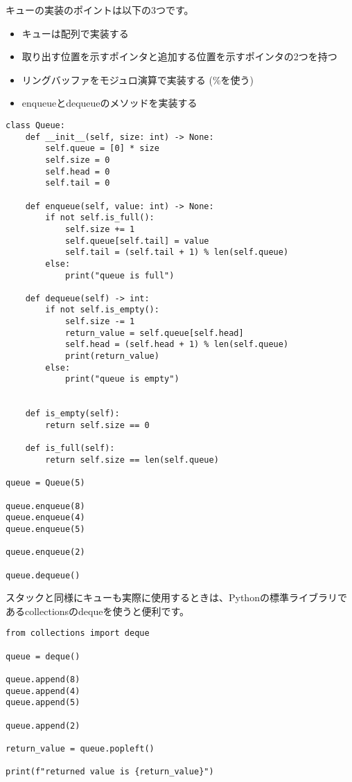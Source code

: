 \documentclass{jlreq}
\begin{document}
キューの実装のポイントは以下の3つです。
\begin{itemize}
	\item キューは配列で実装する
	\item 取り出す位置を示すポインタと追加する位置を示すポインタの2つを持つ
	\item リングバッファをモジュロ演算で実装する (\%を使う)
	\item enqueueとdequeueのメソッドを実装する
\end{itemize}

\begin{lstlisting}[caption=キューの実装, frame=TRBL, label={queue}]
	class Queue:
    def __init__(self, size: int) -> None:
        self.queue = [0] * size
        self.size = 0
        self.head = 0
        self.tail = 0
        
    def enqueue(self, value: int) -> None:
        if not self.is_full():
            self.size += 1
            self.queue[self.tail] = value
            self.tail = (self.tail + 1) % len(self.queue)
        else:
            print("queue is full")
    
    def dequeue(self) -> int:
        if not self.is_empty():
            self.size -= 1
            return_value = self.queue[self.head]
            self.head = (self.head + 1) % len(self.queue)
            print(return_value)
        else:
            print("queue is empty")
        
    
    def is_empty(self):
        return self.size == 0

    def is_full(self):
        return self.size == len(self.queue)

queue = Queue(5)

queue.enqueue(8)
queue.enqueue(4)
queue.enqueue(5)

queue.enqueue(2)

queue.dequeue()

\end{lstlisting}

\begin{tcolorbox}[enhanced, title=Column2 collections.deque, breakable, colback=white, drop fuzzy shadow, attach boxed title to top center={yshift*=0.1cm}]
	スタックと同様にキューも実際に使用するときは、Pythonの標準ライブラリであるcollectionsのdequeを使うと便利です。
	
	\begin{lstlisting}[frame=TRBL]
		from collections import deque

queue = deque()

queue.append(8)
queue.append(4)
queue.append(5)

queue.append(2)

return_value = queue.popleft()

print(f"returned value is {return_value}")
	\end{lstlisting}
\end{tcolorbox}
\end{document}
